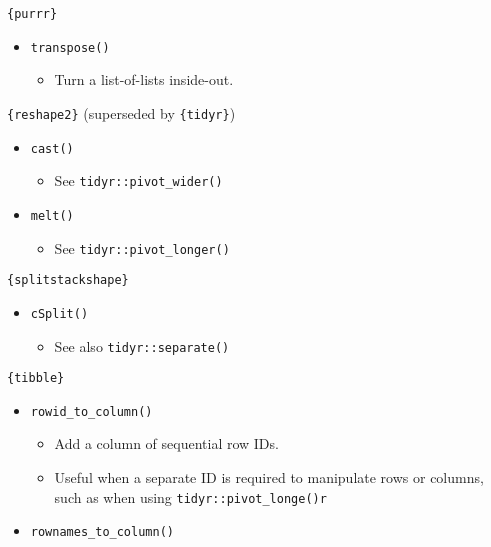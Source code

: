 \documentclass[
]{book}
\providecommand{\tightlist}{%
  \setlength{\itemsep}{0pt}\setlength{\parskip}{0pt}}
\begin{document}
\texttt{\{purrr\}}

\begin{itemize}
\tightlist
\item
  \texttt{transpose()}

  \begin{itemize}
  \tightlist
  \item
    Turn a list-of-lists inside-out.
  \end{itemize}
\end{itemize}

\texttt{\{reshape2\}} (superseded by \texttt{\{tidyr\}})

\begin{itemize}
\tightlist
\item
  \texttt{cast()}

  \begin{itemize}
  \tightlist
  \item
    See \texttt{tidyr::pivot\_wider()}
  \end{itemize}
\item
  \texttt{melt()}

  \begin{itemize}
  \tightlist
  \item
    See \texttt{tidyr::pivot\_longer()}
  \end{itemize}
\end{itemize}

\texttt{\{splitstackshape\}}

\begin{itemize}
\tightlist
\item
  \texttt{cSplit()}

  \begin{itemize}
  \tightlist
  \item
    See also \texttt{tidyr::separate()}
  \end{itemize}
\end{itemize}

\texttt{\{tibble\}}

\begin{itemize}
\tightlist
\item
  \texttt{rowid\_to\_column()}

  \begin{itemize}
  \tightlist
  \item
    Add a column of sequential row IDs.
  \item
    Useful when a separate ID is required to manipulate rows or columns, such as when using \texttt{tidyr::pivot\_longe()r}
  \end{itemize}
\item
  \texttt{rownames\_to\_column()}
\end{itemize}
\end{document}
